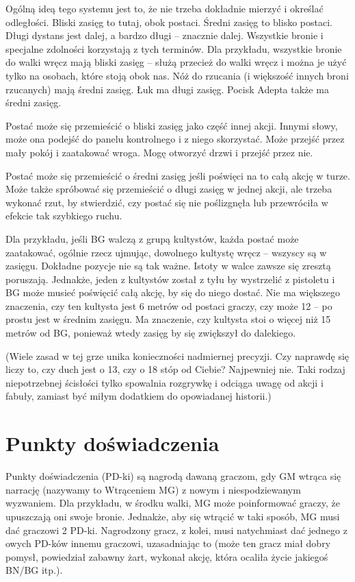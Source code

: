 Ogólną ideą tego systemu jest to, że nie trzeba dokładnie mierzyć i określać odległości. Bliski zasięg to tutaj, obok postaci. Średni zasięg to blisko postaci. Długi dystans jest dalej, a bardzo długi – znacznie dalej.
Wszystkie bronie i specjalne zdolności korzystają z tych terminów. Dla przykładu, wszystkie bronie do walki wręcz mają bliski zasięg – służą przecież do walki wręcz i można je użyć tylko na osobach, które stoją obok nas. Nóż do rzucania (i większość innych broni rzucanych) mają średni zasięg. Łuk ma długi zasięg. Pocisk Adepta także ma średni zasięg.

Postać może się przemieścić o bliski zasięg jako część innej akcji. Innymi słowy, może ona podejść do panelu kontrolnego i z niego skorzystać. Może przejść przez mały pokój i zaatakować wroga. Mogę otworzyć drzwi i przejść przez nie.

Postać może się przemieścić o średni zasięg jeśli poświęci na to całą akcję w turze. Może także spróbować się przemieścić o długi zasięg w jednej akcji, ale trzeba wykonać rzut, by stwierdzić, czy postać się nie poślizgnęła lub  przewróciła w efekcie tak szybkiego ruchu.

Dla przykładu, jeśli BG walczą z grupą kultystów, każda postać może zaatakować, ogólnie rzecz ujmując, dowolnego kultystę wręcz – wszyscy są w zasięgu. Dokładne pozycje nie są tak ważne. Istoty w walce zawsze się zresztą poruszają. Jednakże, jeden z kultystów został z tyłu by wystrzelić z pistoletu i BG może musieć poświęcić całą akcję, by się do niego dostać. Nie ma większego znaczenia, czy ten kultysta jest 6 metrów od postaci graczy, czy może 12 – po prostu jest w średnim zasięgu. Ma znaczenie, czy kultysta stoi o więcej niż 15 metrów od BG, ponieważ wtedy zasięg by się zwiększył do dalekiego.

(Wiele zasad w tej grze unika konieczności nadmiernej precyzji. Czy naprawdę się liczy to, czy duch jest o 13, czy o 18 stóp od Ciebie? Najpewniej nie. Taki rodzaj niepotrzebnej ścisłości tylko spowalnia rozgrywkę i odciąga uwagę od akcji i fabuły, zamiast być miłym dodatkiem do opowiadanej historii.)

\section {Punkty doświadczenia}

Punkty doświadczenia (PD-ki) są nagrodą dawaną graczom, gdy GM wtrąca się narrację (nazywamy to Wtrąceniem MG) z nowym i niespodziewanym wyzwaniem. Dla przykładu, w środku walki, MG może poinformować graczy, że upuszczają oni swoje bronie. Jednakże, aby się wtrącić w taki sposób, MG musi dać graczowi 2 PD-ki. Nagrodzony gracz, z kolei, musi natychmiast dać jednego z owych PD-ków innemu graczowi, uzasadniając to (może ten gracz miał dobry pomysł, powiedział zabawny żart, wykonał akcję, która ocaliła życie jakiegoś BN/BG itp.).


